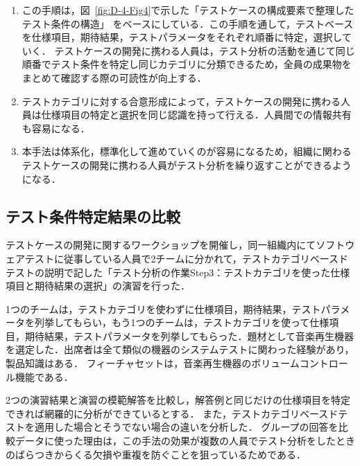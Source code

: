 \begin{enumerate}
\item この手順は，図~\ref{fig:D-4-Fig4}で示した「テストケースの構成要素で整理したテスト条件の構造」
をベースにしている．この手順を通して，テストベースを仕様項目，期待結果，テストパラメータをそれぞれ順番に特定，選択していく．
テストケースの開発に携わる人員は，テスト分析の活動を通じて同じ順番でテスト条件を特定し同じカテゴリに分類できるため，全員の成果物をまとめて確認する際の可読性が向上する．
\item テストカテゴリに対する合意形成によって，テストケースの開発に携わる人員は仕様項目の特定と選択を同じ認識を持って行える．人員間での情報共有も容易になる．
\item 本手法は体系化，標準化して進めていくのが容易になるため，組織に関わるテストケースの開発に携わる人員がテスト分析を繰り返すことができるようになる．
\end{enumerate}

\subsection{テスト条件特定結果の比較}

テストケースの開発に関するワークショップを開催し，同一組織内にてソフトウェアテストに従事している人員で2チームに分かれて，テストカテゴリベースドテストの説明で記した「テスト分析の作業Step3：テストカテゴリを使った仕様項目と期待結果の選択」の演習を行った．

1つのチームは，テストカテゴリを使わずに仕様項目，期待結果，テストパラメータを列挙してもらい，もう1つのチームは，テストカテゴリを使って仕様項目，期待結果，テストパラメータを列挙してもらった．題材として音楽再生機器を選定した．出席者は全て類似の機器のシステムテストに関わった経験があり，製品知識はある．
フィーチャセットは，音楽再生機器のボリュームコントロール機能である．

2つの演習結果と演習の模範解答を比較し，解答例と同じだけの仕様項目を特定できれば網羅的に分析ができているとする．
また，テストカテゴリベースドテストを適用した場合とそうでない場合の違いを分析した．
グループの回答を比較データに使った理由は，この手法の効果が複数の人員でテスト分析をしたときのばらつきからくる欠損や重複を防ぐことを狙っているためである．

